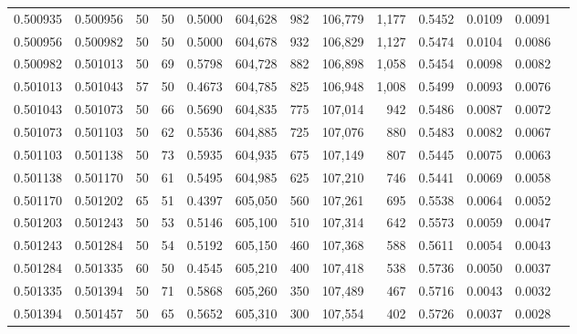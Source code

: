 \begin{tabular}{rrrrrrrrrrrrr}
0.500935 & 0.500956 &    50 &  50 &                                     0.5000 & 604,628 &     982 & 106,779 &   1,177 & 0.5452 & 0.0109 & 0.0091 \\
0.500956 & 0.500982 &    50 &  50 &                                     0.5000 & 604,678 &     932 & 106,829 &   1,127 & 0.5474 & 0.0104 & 0.0086 \\
0.500982 & 0.501013 &    50 &  69 &                                     0.5798 & 604,728 &     882 & 106,898 &   1,058 & 0.5454 & 0.0098 & 0.0082 \\
0.501013 & 0.501043 &    57 &  50 &                                     0.4673 & 604,785 &     825 & 106,948 &   1,008 & 0.5499 & 0.0093 & 0.0076 \\
0.501043 & 0.501073 &    50 &  66 &                                     0.5690 & 604,835 &     775 & 107,014 &     942 & 0.5486 & 0.0087 & 0.0072 \\
0.501073 & 0.501103 &    50 &  62 &                                     0.5536 & 604,885 &     725 & 107,076 &     880 & 0.5483 & 0.0082 & 0.0067 \\
0.501103 & 0.501138 &    50 &  73 &                                     0.5935 & 604,935 &     675 & 107,149 &     807 & 0.5445 & 0.0075 & 0.0063 \\
0.501138 & 0.501170 &    50 &  61 &                                     0.5495 & 604,985 &     625 & 107,210 &     746 & 0.5441 & 0.0069 & 0.0058 \\
0.501170 & 0.501202 &    65 &  51 &                                     0.4397 & 605,050 &     560 & 107,261 &     695 & 0.5538 & 0.0064 & 0.0052 \\
0.501203 & 0.501243 &    50 &  53 &                                     0.5146 & 605,100 &     510 & 107,314 &     642 & 0.5573 & 0.0059 & 0.0047 \\
0.501243 & 0.501284 &    50 &  54 &                                     0.5192 & 605,150 &     460 & 107,368 &     588 & 0.5611 & 0.0054 & 0.0043 \\
0.501284 & 0.501335 &    60 &  50 &                                     0.4545 & 605,210 &     400 & 107,418 &     538 & 0.5736 & 0.0050 & 0.0037 \\
0.501335 & 0.501394 &    50 &  71 &                                     0.5868 & 605,260 &     350 & 107,489 &     467 & 0.5716 & 0.0043 & 0.0032 \\
0.501394 & 0.501457 &    50 &  65 &                                     0.5652 & 605,310 &     300 & 107,554 &     402 & 0.5726 & 0.0037 & 0.0028 \\

\end{tabular}

